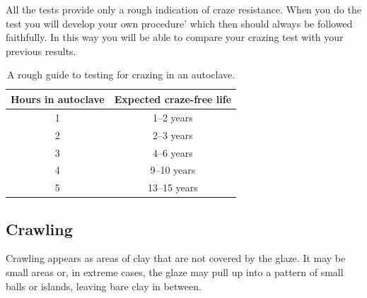 All the tests provide only a rough indication of craze resistance. When you do 
the test you will develop your own procedure' which then should always be 
followed faithfully. In this way you will be able to compare your crazing test 
with your previous results.
\begin{center}
  \renewcommand{\arraystretch}{1.5}
  \begin{table}\centering
    \begin{tabular}{|c|c|}\hline
      \textbf{Hours in autoclave}&\textbf{Expected craze-free 
      life}\\\hline\hline
      1&1--2 years\\\hline
      2&2--3 years\\\hline
      3&4--6 years\\\hline
      4&9--10 years\\\hline
      5&13--15 years\\\hline
    \end{tabular}
    \caption{A rough guide to testing for crazing in an autoclave.}
    \label{tab:autoclave}
  \end{table}
\end{center}
\subsection{Crawling}
Crawling appears as areas of clay that are not covered by the glaze. It may be 
small areas or, in extreme cases, the glaze may pull up into a pattern of small 
balls or islands, leaving bare clay in between.

